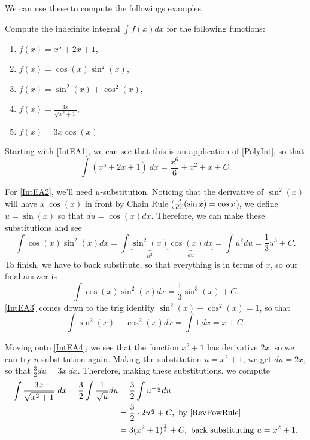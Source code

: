 We can use these to compute the followings examples. %
\begin{exmps}

Compute the indefinite integral $\int f(x)dx$ for the following functions:
\begin{enumerate}[label=\textbf{Example A.\arabic*.}]
  \addtolength{\itemindent}{1.625cm} %
  \item \label{IntEA1} $f(x)=x^5+2x+1$, %
  \item \label{IntEA2} $f(x)=\cos(x)\sin^2(x)$, %
  \item \label{IntEA3} $f(x)= \sin^2(x)+\cos^2(x)$, %
  \item \label{IntEA4} $f(x)=\frac{3x}{\sqrt{x^2+1}}$, %
  \item \label{IntEA5} $f(x)= 3x\cos(x)$ %
\end{enumerate}

Starting with \ref{IntEA1}, we can see that this is an application of \cref{PolyInt}, so that
\[
\int (x^5+2x+1)\ dx=\frac{x^6}{6}+x^2+x+C.
\]

For \ref{IntEA2}, we'll need $u$-substitution. Noticing that the derivative of $\sin^2(x)$ will have a $\cos(x)$ in front by Chain Rule ($\frac{d }{d x}(\sin x)=\cos x$), we define $u=\sin(x)$ so that $du=\cos(x)dx$. Therefore, we can make these substitutions and see
\[
\int \cos(x)\sin^2(x)dx=\int \underbrace{\sin^2(x)}_{u^2}\underbrace{\cos(x)dx}_{du}=\int u^2du= \frac{1}{3}u^3+C.
\]
To finish, we have to back substitute, so that everything is in terms of $x$, so our final answer is
\[
\int \cos(x)\sin^2(x)dx=\frac{1}{3}\sin^3(x)+C.
\]
\ref{IntEA3} comes down to the trig identity $\sin^2(x)+\cos^2(x)=1$, so that
\[
\int \sin^2(x)+\cos^2(x) dx= \int 1\ dx= x+C.
\]

Moving onto \ref{IntEA4}, we see that the function $x^2+1$ has derivative $2x$, so we can try $u$-substitution again. Making the substitution $u=x^2+1$, we get $du=2x$, so that $\frac{3}{2}du=3x\ dx$. Therefore, making these substitutions, we compute
\begin{align}
  \int \frac{3x}{\sqrt{x^2+1}}\ dx=\frac{3}{2}\int\frac{1}{\sqrt{u}}du& =\frac{3}{2}\int u^{-\frac{1}{2}}du\\
  &= \frac{3}{2}\cdot2u^{\frac{1}{2}}+C, \text{ by \cref{RevPowRule}}\\
  &= 3(x^2+1)^{\frac{1}{2}}+C, \text{ back substituting }u=x^2+1.
\end{align}


\end{exmps}
